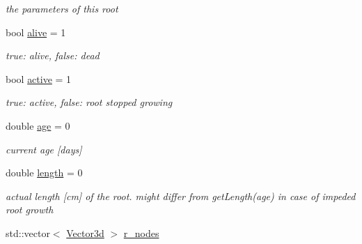\begin{DoxyCompactItemize}
\begin{DoxyCompactList}\small\item\em the parameters of this root \end{DoxyCompactList}\item 
\mbox{\label{classCPlantBox_1_1Organ_a0889e6bf6d670b945de355dbc6e96965}} 
bool \hyperlink{classCPlantBox_1_1Organ_a0889e6bf6d670b945de355dbc6e96965}{alive} = 1
\begin{DoxyCompactList}\small\item\em true\+: alive, false\+: dead \end{DoxyCompactList}\item 
\mbox{\label{classCPlantBox_1_1Organ_a37cba2abb3c4052d7e69b57019589b78}} 
bool \hyperlink{classCPlantBox_1_1Organ_a37cba2abb3c4052d7e69b57019589b78}{active} = 1
\begin{DoxyCompactList}\small\item\em true\+: active, false\+: root stopped growing \end{DoxyCompactList}\item 
\mbox{\label{classCPlantBox_1_1Organ_a4f17f0bfe7f03eedf4138fd8fe51376d}} 
double \hyperlink{classCPlantBox_1_1Organ_a4f17f0bfe7f03eedf4138fd8fe51376d}{age} = 0
\begin{DoxyCompactList}\small\item\em current age \mbox{[}days\mbox{]} \end{DoxyCompactList}\item 
\mbox{\label{classCPlantBox_1_1Organ_a94f5b16aa7ebc3912501051281fe88dc}} 
double \hyperlink{classCPlantBox_1_1Organ_a94f5b16aa7ebc3912501051281fe88dc}{length} = 0
\begin{DoxyCompactList}\small\item\em actual length \mbox{[}cm\mbox{]} of the root. might differ from get\+Length(age) in case of impeded root growth \end{DoxyCompactList}\item 
\mbox{\label{classCPlantBox_1_1Organ_a3c27ae9dcbe4f4f8a0f07450d8c4ac14}} 
std\+::vector$<$ \hyperlink{classCPlantBox_1_1Vector3d}{Vector3d} $>$ \hyperlink{classCPlantBox_1_1Organ_a3c27ae9dcbe4f4f8a0f07450d8c4ac14}{r\+\_\+nodes}

\end{DoxyCompactItemize}
